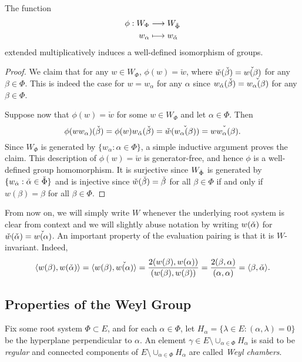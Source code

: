 \begin{proposition}
    The function
    \begin{align*}
        \phi:W_{\Phi}&\longrightarrow W_{\check{\Phi}}\\
        w_\alpha&\longmapsto w_{\check{\alpha}}
    \end{align*}
    extended multiplicatively induces a well-defined isomorphism of groups.
\end{proposition}
\begin{proof}
    We claim that for any $w\in W_\Phi$, $\phi(w)=\check{w}$, where $\check{w}(\check{\beta})=\check{w(\beta)}$ for any $\beta\in\Phi$. This is indeed the case for $w=w_\alpha$ for any $\alpha$ since $w_{\check{\alpha}}(\check{\beta})=\check{w_\alpha(\beta)}$ for any $\beta\in\Phi$. 
    
    Suppose now that $\phi(w)=\check{w}$ for some $w\in W_\Phi$ and let $\alpha\in\Phi$. Then $$\phi(ww_\alpha)(\check{\beta})=\phi(w)w_{\check{\alpha}}(\check{\beta})=\check{w}(\check{w_\alpha(\beta)})=\check{ww_\alpha(\beta)}.$$
    Since $W_\Phi$ is generated by $\{w_\alpha:\alpha\in\Phi\}$, a simple inductive argument proves the claim. This description of $\phi(w)=\check{w}$ is generator-free, and hence $\phi$ is a well-defined group homomorphism. It is surjective since $W_{\check{\Phi}}$ is generated by $\{w_{\check{\alpha}}:\check{\alpha}\in\check{\Phi}\}$ and is injective since $\check{w}(\check{\beta})=\check{\beta}$ for all $\beta\in\Phi$ if and only if $w(\beta)=\beta$ for all $\beta\in\Phi$.
\end{proof}

From now on, we will simply write $W$ whenever the underlying root system is clear from context and we will slightly abuse notation by writing $w(\check{\alpha})$ for $\check{w}(\check{\alpha})=\check{w(\alpha)}$. An important property of the evaluation pairing is that it is $W$-invariant. Indeed, 
$$\langle w(\beta),w(\check{\alpha})\rangle=\langle w(\beta),\check{w(\alpha)}\rangle=\frac{2(w(\beta),w(\alpha))}{(w(\beta),w(\beta))}=\frac{2(\beta,\alpha)}{(\alpha,\alpha)}=\langle\beta,\check{\alpha}\rangle.$$

\subsection{Properties of the Weyl Group}

Fix some root system $\Phi\subset E$, and for each $\alpha\in\Phi$, let $H_\alpha=\{\lambda\in E:(\alpha,\lambda)=0\}$ be the hyperplane perpendicular to $\alpha$. An element $\gamma\in E\setminus\cup_{\alpha\in\Phi}H_\alpha$ is said to be \textit{regular} and connected components of $E\setminus\cup_{\alpha\in\Phi}H_\alpha$ are called \textit{Weyl chambers}. 

